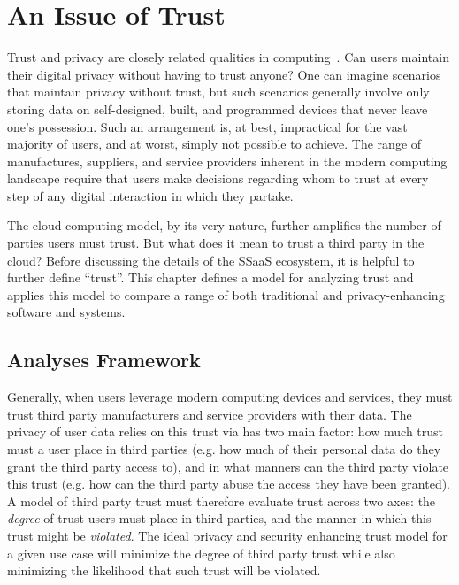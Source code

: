 \chapter{An Issue of Trust}
\label{chap:trust}

Trust and privacy are closely related qualities in
computing~\cite{flowerday2006}. Can users maintain their digital
privacy without having to trust anyone? One can imagine scenarios that
maintain privacy without trust, but such scenarios generally involve
only storing data on self-designed, built, and programmed devices that
never leave one's possession. Such an arrangement is, at best,
impractical for the vast majority of users, and at worst, simply not
possible to achieve. The range of manufactures, suppliers, and service
providers inherent in the modern computing landscape require that
users make decisions regarding whom to trust at every step of any
digital interaction in which they partake.

The cloud computing model, by its very nature, further amplifies the
number of parties users must trust. But what does it mean to trust a
third party in the cloud? Before discussing the details of the SSaaS
ecosystem, it is helpful to further define ``trust''. This chapter
defines a model for analyzing trust and applies this model to compare
a range of both traditional and privacy-enhancing software and
systems.

\section{Analyses Framework}
\label{chap:trust:framework}

Generally, when users leverage modern computing devices and services,
they must trust third party manufacturers and service providers with
their data. The privacy of user data relies on this trust via has two
main factor: how much trust must a user place in third parties
(e.g. how much of their personal data do they grant the third party
access to), and in what manners can the third party violate this trust
(e.g. how can the third party abuse the access they have been
granted). A model of third party trust must therefore evaluate trust
across two axes: the \emph{degree} of trust users must place in third
parties, and the manner in which this trust might be
\emph{violated}. The ideal privacy and security enhancing trust model
for a given use case will minimize the degree of third party trust
while also minimizing the likelihood that such trust will be violated.

